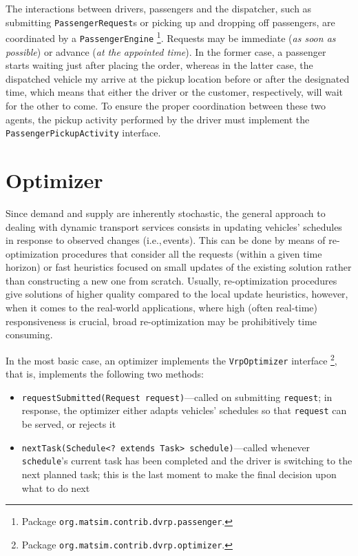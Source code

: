 The interactions between drivers, passengers and the dispatcher, such as submitting \lstinline$PassengerRequest$s or picking up and dropping off passengers, are coordinated by a \lstinline{PassengerEngine}%
\footnote{
Package \lstinline$org.matsim.contrib.dvrp.passenger$.
}.
Requests may be immediate (\emph{as soon as possible}) or advance (\emph{at the appointed time}). In the former case, a passenger starts waiting just after placing the order, whereas in the latter case, the dispatched vehicle my arrive at the pickup location before or after the designated time, which means that either the driver or the customer, respectively, will wait for the other to come. To ensure the proper coordination between these two agents, the pickup activity performed by the driver must implement the \lstinline$PassengerPickupActivity$ interface.

\section{Optimizer}
\label{sec:VRP-optimizer}
Since demand and supply are inherently stochastic, the general approach to dealing with dynamic transport services consists in updating vehicles' schedules in response to observed changes (i.e.,\,events). This can be done by means of re-optimization procedures that consider all the requests (within a given time horizon) or fast heuristics focused on small updates of the existing solution rather than constructing a new one from scratch. Usually, re-optimization procedures give solutions of higher quality compared to the local update heuristics, however, when it comes to the real-world applications, where high (often real-time) responsiveness is crucial, broad re-optimization may be prohibitively time consuming.

In the most basic case, an optimizer implements the \lstinline$VrpOptimizer$ interface%
\footnote{
Package \lstinline$org.matsim.contrib.dvrp.optimizer$.
},
that is, implements the following two methods:
%
\begin{itemize}
	\item \lstinline$requestSubmitted(Request request)$---called on submitting \lstinline$request$; in response, the optimizer either adapts vehicles' schedules so that \lstinline$request$ can be served, or rejects it
	
	\item \lstinline$nextTask(Schedule<? extends Task> schedule)$---called whenever \lstinline$schedule$'s current task has been completed and the driver is switching to the next planned task; this is the last moment to make the final decision upon what to do next

\end{itemize}

